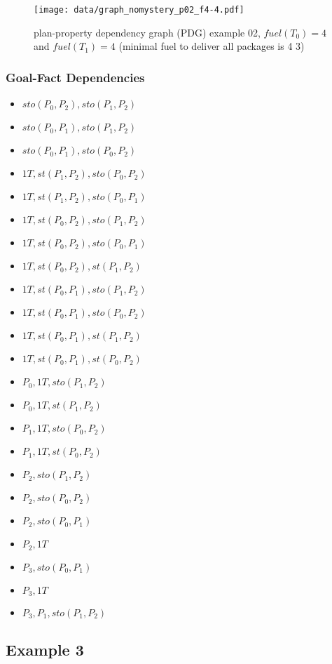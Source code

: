 \begin{figure}[ht]
\begin{center}
	\texttt{[image: data/graph\_nomystery\_p02\_f4-4.pdf]}
\end{center}
\caption{plan-property dependency graph (PDG) example 02, $fuel(T_0) = 4$ and $fuel(T_1) = 4$ (minimal fuel to deliver all packages is 4 3)}
\end{figure}

\FloatBarrier
\subsubsection*{Goal-Fact Dependencies}

\begin{itemize}
	\item $sto(P_0,P_2),sto(P_1,P_2)$
	\item $sto(P_0,P_1),sto(P_1,P_2)$
	\item $sto(P_0,P_1),sto(P_0,P_2)$
	\item $1T,st(P_1,P_2),sto(P_0,P_2)$
	\item $1T,st(P_1,P_2),sto(P_0,P_1)$
	\item $1T,st(P_0,P_2),sto(P_1,P_2)$
	\item $1T,st(P_0,P_2),sto(P_0,P_1)$
	\item $1T,st(P_0,P_2),st(P_1,P_2)$
	\item $1T,st(P_0,P_1),sto(P_1,P_2)$
	\item $1T,st(P_0,P_1),sto(P_0,P_2)$
	\item $1T,st(P_0,P_1),st(P_1,P_2)$
	\item $1T,st(P_0,P_1),st(P_0,P_2)$
	\item $P_0,1T,sto(P_1,P_2)$
	\item $P_0,1T,st(P_1,P_2)$
	\item $P_1,1T,sto(P_0,P_2)$
	\item $P_1,1T,st(P_0,P_2)$
	\item $P_2,sto(P_1,P_2)$
	\item $P_2,sto(P_0,P_2)$
	\item $P_2,sto(P_0,P_1)$
	\item $P_2,1T$
	\item $P_3,sto(P_0,P_1)$
	\item $P_3,1T$
	\item $P_3,P_1,sto(P_1,P_2)$
\end{itemize}

\newpage
\subsection*{Example 3}

